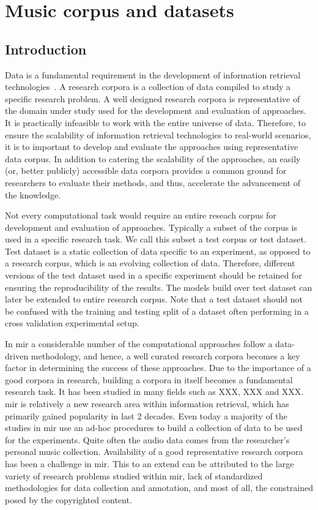 
\chapter{Music corpus and datasets}\label{chap:datasets}

\section{Introduction}
\label{sec:corpus_intro}

Data is a fundamental requirement in the development of information retrieval technologies~\citep{manning2008introduction}. A research corpora is a collection of data compiled to study a specific research problem. A well designed research corpora is representative of the domain under study used for the development and evaluation of approaches. It is practically infeasible to work with the entire universe of data. Therefore, to ensure the scalability of information retrieval technologies to real-world scenarios, it is to important to develop and evaluate the approaches using representative data corpus. In addition to catering the scalability of the approaches, an easily (or, better publicly) accessible data corpora provides a common ground for researchers to evaluate their methods, and thus, accelerate the advancement of the knowledge. 

Not every computational task would require an entire reseach corpus for development and evaluation of approaches. Typically a subset of the corpus is used in a specific research task. We call this subset a test corpus or test dataset. Test dataset is a static collection of data specific to an experiment, as opposed to a research corpus, which is an evolving collection of data. Therefore, different versions of the test dataset used in a specific experiment should be retained for ensuring the reproducibility of the results. The models build over test dataset can later be extended to entire research corpus. Note that a test dataset should not be confused with the training and testing split of a dataset often performing in a cross validation experimental setup.


In \gls{mir} a considerable number of the computational approaches follow a data-driven methodology, and hence, a well curated research corpora becomes a key factor in determining the success of these approaches. Due to the importance of a good corpora in research, building a corpora in itself becomes a fundamental research task. It has been studied in many fields such as XXX, XXX and XXX. \Gls{mir} is relatively a new research area within information retrieval, which has primarily gained popularity in last 2 decades. Even today a majority of the studies in \gls{mir} use an ad-hoc procedures to build a collection of data to be used for the experiments. Quite often the audio data comes from the researcher's personal music collection. Availability of a good representative research corpora has been a challenge in \gls{mir}. This to an extend can be attributed to the large variety of research problems studied within \gls{mir}, lack of standardized methodologies for data collection and annotation, and most of all, the constrained posed by the copyrighted content.

